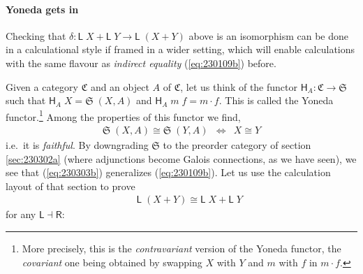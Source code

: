 \documentclass{elsarticle}
\newcommand{\Conid}[1]{\mathit{#1}}
\newcommand{\Varid}[1]{\mathit{#1}}
\def\comp{ \mathbin{\cdot} }
\def\fun#1{\mathsf{#1}}
\def\cat#1{{\mathfrak #1}}
\def\start{&&}
\def\equiv{\Leftrightarrow}
\begin{document}
\paragraph{Yoneda gets in}
Checking that \ensuremath{\delta\mathbin{:}\fun L \;\Conid{X}\mathbin{+}\fun L \;\Conid{Y}\to \fun L \;(\Conid{X}\mathbin{+}\Conid{Y})} above is an isomorphism can be done in a calculational
style if framed in a wider setting, which will enable calculations with the
same flavour as \emph{indirect equality} (\ref{eq:230109b}) before.

Given a category \ensuremath{\cat{C}} and an object \ensuremath{\Conid{A}} of \ensuremath{\cat{C}}, let us think of the functor \ensuremath{\fun H _{\Conid{A}}\mathbin{:}\cat{C}\to \cat{S}}
such that
	\ensuremath{\fun H _{\Conid{A}}\;\Conid{X}\mathrel{=}\cat{S}\;(\Conid{X},\Conid{A})} and
	\ensuremath{\fun H _{\Conid{A}}\;\Varid{m}\;\Varid{f}\mathrel{=}\Varid{m} \comp \Varid{f}}. This is called the Yoneda functor.\footnote{More precisely,
this is the \emph{contravariant} version of the Yoneda functor, the \emph{covariant} one being
obtained by swapping \ensuremath{\Conid{X}} with \ensuremath{\Conid{Y}} and \ensuremath{\Varid{m}} with \ensuremath{\Varid{f}} in \ensuremath{\Varid{m} \comp \Varid{f}}.} Among the properties of this
functor we find,
\begin{eqnarray}
	\ensuremath{\cat{S}\;(\Conid{X},\Conid{A})\cong\cat{S}\;(\Conid{Y},\Conid{A})} & \equiv & \ensuremath{\Conid{X}\cong\Conid{Y}}
	\label{eq:230303b}
\end{eqnarray}
i.e.\ it is \emph{faithful}. By downgrading \ensuremath{\cat{S}} to the preorder category of section 
\ref{sec:230302a} (where adjunctions become Galois connections, as we have seen),
we see that (\ref{eq:230303b}) generalizes (\ref{eq:230109b}). Let us use the
calculation layout of that section to prove
\begin{eqnarray}
\start \ensuremath{\fun L \;(\Conid{X}\mathbin{+}\Conid{Y})\cong\fun L \;\Conid{X}\mathbin{+}\fun L \;\Conid{Y}}
	\label{eq:230303c}
\end{eqnarray}
for any \ensuremath{\fun L \mathbin\dashv \fun R }:
%
\end{document}

